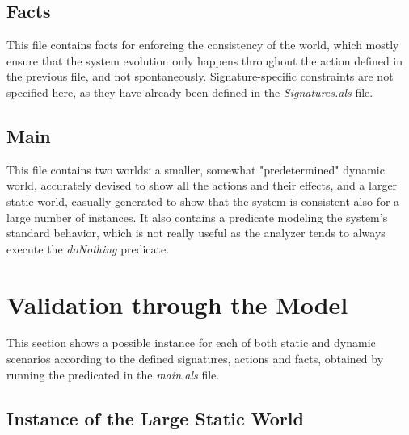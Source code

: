 

\subsection{Facts} 

This file contains facts for enforcing the consistency of the world, which mostly ensure that the system evolution only happens throughout the action defined in the previous file, and not spontaneously. Signature-specific constraints are not specified here, as they have already been defined in the \textit{Signatures.als} file.



\subsection{Main}

This file contains two worlds: a smaller, somewhat "predetermined" dynamic world, accurately devised to show all the actions and their effects, and a larger static world, casually generated to show that the system is consistent also for a large number of instances. It also contains a predicate modeling the system's standard behavior, which is not really useful as the analyzer tends to always execute the \textit{doNothing} predicate.



\section{Validation through the Model}
\label{subsec:Validation through the Model}%

This section shows a possible instance for each of both static and dynamic scenarios according to the defined signatures, actions and facts, obtained by running the predicated in the \textit{main.als} file. 

\subsection{Instance of the Large Static World}

